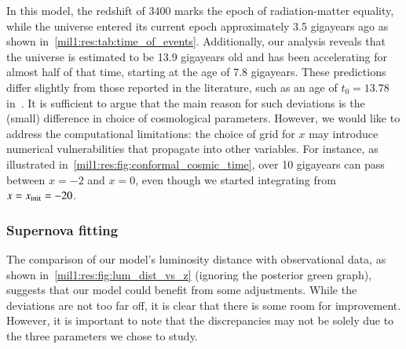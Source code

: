 
In this model, the redshift of 3400 marks the epoch of radiation-matter equality, while the universe entered its current epoch approximately 3.5 gigayears ago as shown in~\cref{mil1:res:tab:time_of_events}. Additionally, our analysis reveals that the universe is estimated to be 13.9 gigayears old and has been accelerating for almost half of that time, starting at the age of 7.8 gigayears. These predictions differ slightly from those reported in the literature, such as an age of $t_0=13.78$ in~\citet{DodelsonBook}. It is sufficient to argue that the main reason for such deviations is the (small) difference in choice of cosmological parameters. However, we would like to address the computational limitations: the choice of grid for $x$ may introduce numerical vulnerabilities that propagate into other variables. For instance, as illustrated in~\cref{mil1:res:fig:conformal_cosmic_time}, over 10 gigayears can pass between $x=-2$ and $x=0$, even though we started integrating from $x=x_\mathrm{init}=-20$.  







\subsubsection{Supernova fitting}
    The comparison of our model's luminosity distance with observational data, as shown in~\cref{mil1:res:fig:lum_dist_vs_z} (ignoring the posterior green graph), suggests that our model could benefit from some adjustments. While the deviations are not too far off, it is clear that there is some room for improvement. However, it is important to note that the discrepancies may not be solely due to the three parameters we chose to study. 

